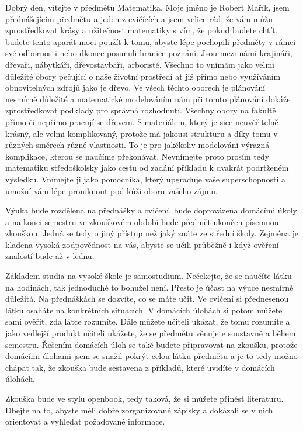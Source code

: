 \documentclass[12pt]{article}
\begin{document}
Dobrý den, vítejte v předmětu Matematika. Moje jméno je Robert Mařík, jsem přednášejícím předmětu a jeden z cvičících a jsem velice rád, že vám můžu zprostředkovat krásy a užitečnost matematiky s vím, že pokud budete chtít, budete tento aparát moci použít k tomu, abyste lépe pochopili předměty v rámci své odbornosti nebo dkonce posunuli hranice poznání. Jsou mezi námi krajináři, dřevaři, nábytkáři, dřevostavbaři, arboristé. Všechno to vnímám jako velmi důležité obory pečující o naše životní prostředí ať již přímo nebo využíváním obnovitelných zdrojů jako je dřevo. Ve všech těchto oborech je plánování nesmírně důležité a matematické modelováním nám při tomto plánování dokáže zprostředkovat podklady pro správná rozhodnutí. Všechny obory na fakultě přímo či nepřímo pracují se dřevem. S materiálem, který je sice neuvěřitelně krásný, ale velmi komplikovaný, protože má jakousi strukturu a díky tomu v různých směrech různé vlastnosti. To je pro jakékoliv modelování výrazná komplikace, kterou se naučíme překonávat. Nevnímejte proto prosím tedy matematiku středoškolsky jako cestu od zadání příkladu k dvakrát podrtženém výsledku. Vnímejte ji jako pomocníka, který upgraduje vaše superschopnosti a umožní vám lépe proniknout pod kůži oboru vašeho zájmu.

Výuka bude rozdělena na přednášky a cvičení, bude doprovázena domácími úkoly a na konci semestru ve zkouškovém období bude předmět ukončen písemnou zkouškou. Jedná se tedy o jiný přístup než jaký znáte ze střední školy. Zejména je kladena vysoká zodpovědnost na vás, abyste se učili průběžně i když ověření znalostí bude až v lednu.

Základem studia na vysoké škole je samostudium. Nečekejte, že se naučíte látku na hodinách, tak jednoduché to bohužel není. Přesto je účast na výuce nesmírně důležitá. Na přednáškách se dozvíte, co se máte učit. Ve cvičení si přednesenou látku osaháte na konkrétních situacích. V domácích úlohách si potom můžete sami ověřit, zda látce rozumíte. Dále můžete učiteli ukázat, že tomu rozumíte a jako vedlejší produkt učiteli ukážete, že se předmětu věnujete soustavně a během semestru. Řešením domácích úloh se také budete připravovat na zkoušku, protože domácími úlohami jsem se snažil pokrýt celou látku předmětu a je to tedy možno chápat tak, že zkouška bude sestavena z příkladů, které uvidíte v domácích úlohách.

Zkouška bude ve stylu openbook, tedy taková, že si můžete přinést literaturu. Dbejte na to, abyste měli dobře zorganizované zápisky a dokázali se v nich orientovat a vyhledat požadované informace.
\end{document}

